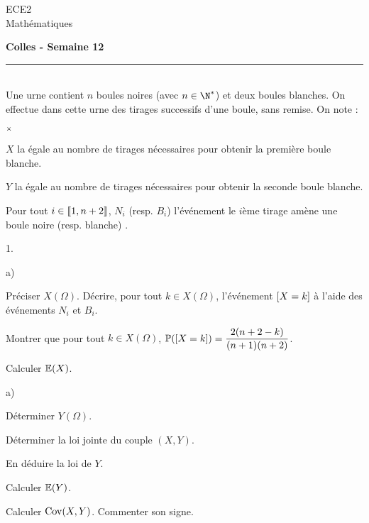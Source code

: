 \documentclass[11pt]{article}%
\begin{document}
\begin{flushleft}
ECE2 \\
Mathématiques
\end{flushleft}

\begin{center}
\textbf{\Large{Colles - Semaine 12}}
\end{center}

\hrule

\vspace*{0,2cm}

\begin{exercice}~\\
Une urne contient $n$ boules noires (avec $n\in\N^*$) et deux boules 
blanches. On effectue dans cette urne des tirages successifs d'une 
boule, sans remise. On note :
\begin{noliste}{$\scriptstyle \times$}
\item $X$ la \var égale au nombre de tirages nécessaires pour 
obtenir la première boule blanche.

\item $Y$ la \var égale au nombre de tirages nécessaires pour 
obtenir la seconde boule blanche.

\item Pour tout $i\in \llbracket 1,n+2\rrbracket$, $N_i$ (resp. $B_i$) 
l'événement \og le $i$ème tirage amène une boule noire (resp. blanche) 
\fg{}.
\end{noliste}
\begin{noliste}{1.}
\item \begin{noliste}{a)}
	\item Préciser $X(\Omega)$. Décrire, pour tout $k\in 
X(\Omega)$, l'événement $\left[ {X=k} \right]$ à l'aide des événements $N_i$ et 
$B_i$.
	\item Montrer que pour tout $k\in X(\Omega)$, $ 
\mathbb{P}(\left[ {X=k} \right])=\dfrac{2(n+2-k)}{(n+1)(n+2)}$.
	\item Calculer $\mathbb{E}(X)$.
	\end{noliste}
\item \begin{noliste}{a)}
	\item Déterminer $Y(\Omega)$.
	\item Déterminer la loi jointe du couple $(X,Y)$.
	\item En déduire la loi de $Y$.
	\item Calculer $\mathbb{E}(Y)$.
	\end{noliste}
\item Calculer $\operatorname{Cov}(X,Y)$. Commenter son signe.
\end{noliste}
\end{exercice}
\end{document}
